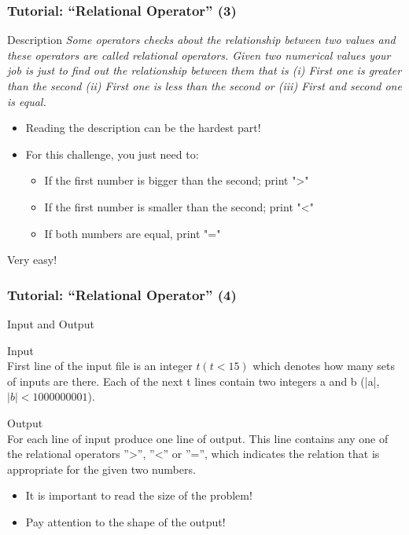 \documentclass{beamer}
\begin{document}
\begin{frame}
  \frametitle{Tutorial: ``Relational Operator'' (3)}

  \begin{block}{Description}
    {\smaller \emph{
    Some operators checks about the relationship between two values and these
    operators are called relational operators. Given two numerical values \alert{your
    job is} just to find out the relationship between them that is (i) First one
    is greater than the second (ii) First one is less than the second or (iii)
    First and second one is equal.}}
  \end{block}

  \begin{itemize}
    \item Reading the description can be the hardest part!
    \item For this challenge, you just need to:
    \begin{itemize}
      \item If the first number is bigger than the second; print ">"
      \item If the first number is smaller than the second; print "<"
      \item If both numbers are equal, print "="
    \end{itemize}
  \end{itemize}
  Very easy!
\end{frame}


\begin{frame}
  \frametitle{Tutorial: ``Relational Operator'' (4)}

  \begin{block}{Input and Output}
    {\smaller
    \alert{Input}\\
    First line of the input file is an integer $t (t < 15)$ which denotes how many sets of inputs are there.
    Each of the next t lines contain two integers a and b (|a|, $|b| < 1000000001$).
    \medskip

    \alert{Output}\\
    For each line of input produce one line of output. This line  contains any one of the relational operators
    ''>'', ''<'' or ''='', which indicates the relation that is appropriate for the given two numbers.
  }
  \end{block}

  \begin{itemize}
    \item It is important to read the \alert{size} of the problem!
    \item Pay attention to the \alert{shape} of the output!
  \end{itemize}

\end{frame}
\end{document}
